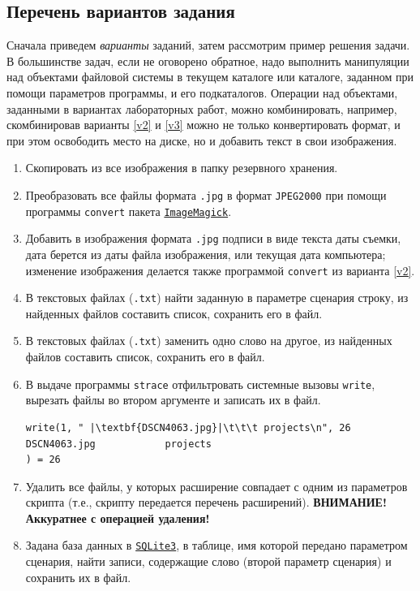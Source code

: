 \documentclass[12pt]{article}
\begin{document}
\subsection{Перечень вариантов задания}

Сначала приведем \emph{варианты} заданий, затем рассмотрим пример решения задачи. В большинстве задач, если не оговорено обратное, надо выполнить манипуляции над объектами файловой системы в текущем каталоге или каталоге, заданном при помощи параметров программы, и его подкаталогов. Операции над объектами, заданными в вариантах лабораторных работ, можно комбинировать, например, скомбинировав варианты \ref{v2} и \ref{v3} можно не только конвертировать формат, и при этом освободить место на диске, но и добавить текст в свои изображения.
\begin{enumerate}
\item Скопировать из все изображения в папку резервного хранения.
\item Преобразовать все файлы формата \texttt{.jpg} в формат \texttt{JPEG2000} при помощи программы \texttt{convert} пакета \href{https://imagemagick.org/index.php}{\texttt{ImageMagick}}. \label{v2}
\item \label{v3} Добавить в изображения формата \texttt{.jpg} подписи в виде текста даты съемки, дата берется из даты файла изображения, или текущая дата компьютера; изменение изображения делается также программой \texttt{convert} из варианта \ref{v2}.
\item В текстовых файлах (\texttt{.txt}) найти заданную в параметре сценария строку, из найденных файлов составить список, сохранить его в файл.
\item В текстовых файлах (\texttt{.txt}) заменить одно слово на другое, из найденных файлов составить список, сохранить его в файл.
\item В выдаче программы \texttt{strace} отфильтровать системные вызовы \texttt{write}, вырезать файлы во втором аргументе и записать их в файл.
\begin{verbatim}
write(1, " |\textbf{DSCN4063.jpg}|\t\t\t projects\n", 26 DSCN4063.jpg			 projects
) = 26
\end{verbatim}
\item Удалить все файлы, у которых расширение совпадает с одним из параметров скрипта (т.е., скрипту передается перечень расширений). \textbf{ВНИМАНИЕ! Аккуратнее с операцией удаления!}
\item Задана база данных в \href{https://www.sqlite.org/index.html}{\texttt{SQLite3}}, в таблице, имя которой передано параметром сценария, найти записи, содержащие слово (второй параметр сценария) и сохранить их в файл.
\end{enumerate}
\end{document}

